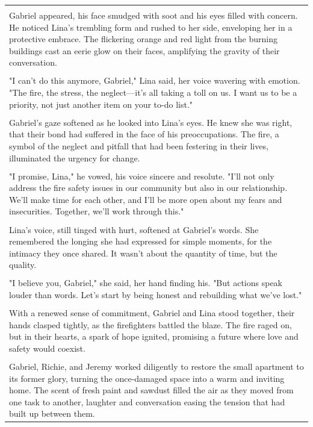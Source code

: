 \begin{small}
\begin{longtable}{p{}}
\\
\\
Gabriel appeared, his face smudged with soot and his eyes filled with concern. He noticed Lina's trembling form and rushed to her side, enveloping her in a protective embrace. The flickering orange and red light from the burning buildings cast an eerie glow on their faces, amplifying the gravity of their conversation.
\\
\\
"I can't do this anymore, Gabriel," Lina said, her voice wavering with emotion. "The fire, the stress, the neglect—it's all taking a toll on us. I want us to be a priority, not just another item on your to-do list."
\\
\\
Gabriel's gaze softened as he looked into Lina's eyes. He knew she was right, that their bond had suffered in the face of his preoccupations. The fire, a symbol of the neglect and pitfall that had been festering in their lives, illuminated the urgency for change.
\\
\\
"I promise, Lina," he vowed, his voice sincere and resolute. "I'll not only address the fire safety issues in our community but also in our relationship. We'll make time for each other, and I'll be more open about my fears and insecurities. Together, we'll work through this."
\\
\\
Lina's voice, still tinged with hurt, softened at Gabriel's words. She remembered the longing she had expressed for simple moments, for the intimacy they once shared. It wasn't about the quantity of time, but the quality.
\\
\\
"I believe you, Gabriel," she said, her hand finding his. "But actions speak louder than words. Let's start by being honest and rebuilding what we've lost."
\\
\\
With a renewed sense of commitment, Gabriel and Lina stood together, their hands clasped tightly, as the firefighters battled the blaze. The fire raged on, but in their hearts, a spark of hope ignited, promising a future where love and safety would coexist.
\\
\\
Gabriel, Richie, and Jeremy worked diligently to restore the small apartment to its former glory, turning the once-damaged space into a warm and inviting home. The scent of fresh paint and sawdust filled the air as they moved from one task to another, laughter and conversation easing the tension that had built up between them.

\end{longtable}
\end{small}
